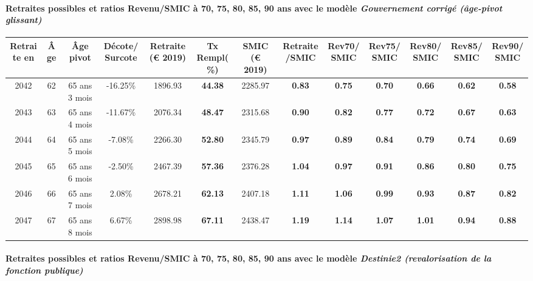 \paragraph{Retraites possibles et ratios Revenu/SMIC à 70, 75, 80, 85, 90 ans avec le modèle \emph{Gouvernement corrigé (âge-pivot glissant)}}  
 
{ \scriptsize \begin{center} 
\begin{tabular}[htb]{|c|c||c|c||c|c||c||c|c|c|c|c|c|} 
\hline 
 Retraite en &  Âge &  Âge pivot &  Décote/Surcote &  Retraite (\euro{} 2019) &  Tx Rempl(\%) &  SMIC (\euro{} 2019) &  Retraite/SMIC &  Rev70/SMIC &  Rev75/SMIC &  Rev80/SMIC &  Rev85/SMIC &  Rev90/SMIC \\ 
\hline \hline 
 2042 &  62 &  65 ans 3 mois &  -16.25\% &  1896.93 &  {\bf 44.38} &  2285.97 &  {\bf {\color{red} 0.83}} &  {\bf {\color{red} 0.75}} &  {\bf {\color{red} 0.70}} &  {\bf {\color{red} 0.66}} &  {\bf {\color{red} 0.62}} &  {\bf {\color{red} 0.58}} \\ 
\hline 
 2043 &  63 &  65 ans 4 mois &  -11.67\% &  2076.34 &  {\bf 48.47} &  2315.68 &  {\bf {\color{red} 0.90}} &  {\bf {\color{red} 0.82}} &  {\bf {\color{red} 0.77}} &  {\bf {\color{red} 0.72}} &  {\bf {\color{red} 0.67}} &  {\bf {\color{red} 0.63}} \\ 
\hline 
 2044 &  64 &  65 ans 5 mois &  -7.08\% &  2266.30 &  {\bf 52.80} &  2345.79 &  {\bf {\color{red} 0.97}} &  {\bf {\color{red} 0.89}} &  {\bf {\color{red} 0.84}} &  {\bf {\color{red} 0.79}} &  {\bf {\color{red} 0.74}} &  {\bf {\color{red} 0.69}} \\ 
\hline 
 2045 &  65 &  65 ans 6 mois &  -2.50\% &  2467.39 &  {\bf 57.36} &  2376.28 &  {\bf 1.04} &  {\bf {\color{red} 0.97}} &  {\bf {\color{red} 0.91}} &  {\bf {\color{red} 0.86}} &  {\bf {\color{red} 0.80}} &  {\bf {\color{red} 0.75}} \\ 
\hline 
 2046 &  66 &  65 ans 7 mois &  2.08\% &  2678.21 &  {\bf 62.13} &  2407.18 &  {\bf 1.11} &  {\bf 1.06} &  {\bf {\color{red} 0.99}} &  {\bf {\color{red} 0.93}} &  {\bf {\color{red} 0.87}} &  {\bf {\color{red} 0.82}} \\ 
\hline 
 2047 &  67 &  65 ans 8 mois &  6.67\% &  2898.98 &  {\bf 67.11} &  2438.47 &  {\bf 1.19} &  {\bf 1.14} &  {\bf 1.07} &  {\bf 1.01} &  {\bf {\color{red} 0.94}} &  {\bf {\color{red} 0.88}} \\ 
\hline 
\hline 
\end{tabular} 
\end{center} } 
\paragraph{Retraites possibles et ratios Revenu/SMIC à 70, 75, 80, 85, 90 ans avec le modèle \emph{Destinie2 (revalorisation de la fonction publique)}}  
 
